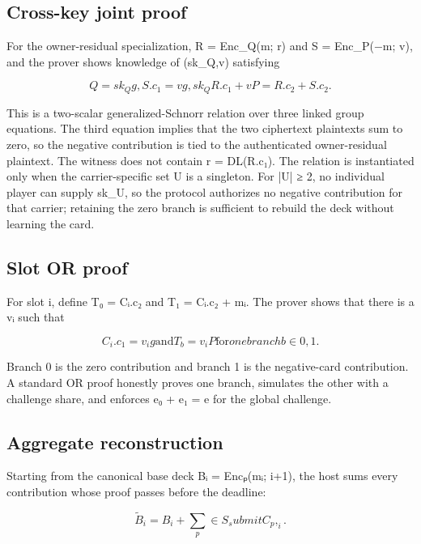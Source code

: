 \documentclass[11pt]{article}
\begin{document}
\subsection{Cross-key joint proof}

For the owner-residual specialization, R = Enc\_Q(m; r) and S = Enc\_P(−m; v), and the prover shows knowledge of (sk\_Q,v) satisfying

\begin{displaymath}Q = sk_Q g,      S.c_{1} = vg,      sk_Q R.c_{1} + vP = R.c_{2} + S.c_{2}.\end{displaymath}

This is a two-scalar generalized-Schnorr relation over three linked group equations. The third equation implies that the two ciphertext plaintexts sum to zero, so the negative contribution is tied to the authenticated owner-residual plaintext. The witness does not contain r = DL(R.c₁). The relation is instantiated only when the carrier-specific set U is a singleton. For |U| ≥ 2, no individual player can supply sk\_U, so the protocol authorizes no negative contribution for that carrier; retaining the zero branch is sufficient to rebuild the deck without learning the card.

\subsection{Slot OR proof}

For slot i, define T₀ = Cᵢ.c₂ and T₁ = Cᵢ.c₂ + mᵢ. The prover shows that there is a vᵢ such that

\begin{displaymath}C_{i}.c_{1} = v_{i}g  \text{and}  T_b = v_{i}P  \text{for} one branch b \in  {0,1}.\end{displaymath}

Branch 0 is the zero contribution and branch 1 is the negative-card contribution. A standard OR proof honestly proves one branch, simulates the other with a challenge share, and enforces e₀ + e₁ = e for the global challenge.

\subsection{Aggregate reconstruction}

Starting from the canonical base deck Bᵢ = Encₚ(mᵢ; i+1), the host sums every contribution whose proof passes before the deadline:

\begin{displaymath}\tilde{B}_{i} = B_{i} + \sum _{p}\in S_submit C_{p},_{i}.\end{displaymath}
\end{document}
